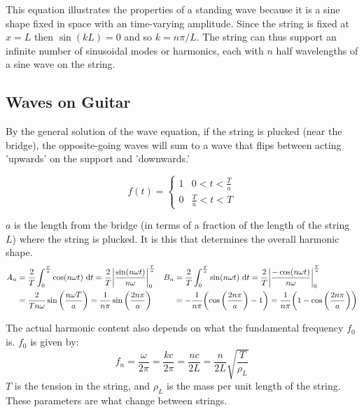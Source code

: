 \documentclass[10pt, a4paper]{article}
\begin{document}
This equation illustrates the properties of a standing wave because it is a sine shape fixed in space with an time-varying amplitude. Since the string is fixed at $x=L$ then $\sin (kL) = 0$ and so $k = n \pi /L $. The string can thus support an infinite number of sinusoidal modes or harmonics, each with $n$ half wavelengths of a sine wave on the string.

\subsection{Waves on Guitar}

By the general solution of the wave equation, if the string is plucked (near the bridge), the opposite-going waves will sum to a wave that flips between acting 'upwards' on the support and 'downwards.' 

\[
f(t)=\begin{cases}1&0<t<\frac{T}{a}\\0&\frac{T}{a}<t<T\end{cases}
\]

$a$ is the length from the bridge (in terms of a fraction of the length of the string $L$) where the string is plucked. It is this that determines the overall harmonic shape.\begin{equation*}
\begin{aligned}
A_n&=\frac{2}{T} \int _0^{\frac{T}{a}}
\cos (n\omega t)\ \dd t
= \frac{2}{T}\vqty{\frac{\sin (n\omega t)}{n\omega}}^{\frac{T}{a}}_0
&B_n&=\frac{2}{T} \int _0^{\frac{T}{a}}
\sin (n\omega t)\ \dd t
= \frac{2}{T}\vqty{\frac{-\cos (n\omega t)}{n\omega}}^{\frac{T}{a}}_0
\\&=\frac{2}{Tn\omega}\sin\pqty{\frac{n\omega T}{a}}
= \frac{1}{n\pi}\sin\pqty{\frac{2n\pi}{a}}
&&= -\frac{1}{n\pi}\pqty{ \cos\pqty{\frac{2n\pi}{a}}-1}
=\frac{1}{n\pi}\pqty{1-\cos\pqty{\frac{2n\pi}{a}}}
\end{aligned}
\end{equation*}

The actual harmonic content also depends on what the fundamental frequency $f_0$ is. $f_0$ is given by:
\[
f_n=\frac{\omega}{2\pi} = \frac{kc}{2\pi} = \frac{nc}{2L} = \frac{n}{2L}\sqrt{\frac{T}{\rho _L}}
\]
$T$ is the tension in the string, and $\rho _L$ is the mass per unit length of the string.
These parameters are what change between strings.
\end{document}

